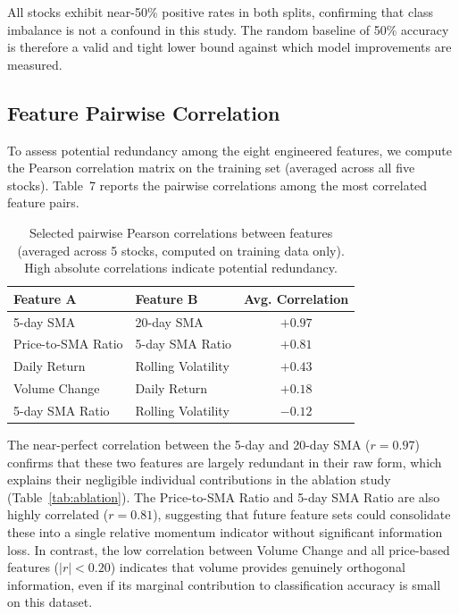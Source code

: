 \documentclass{article}
\begin{document}
All stocks exhibit near-50\% positive rates in both splits, confirming that
class imbalance is not a confound in this study. The random baseline of 50\%
accuracy is therefore a valid and tight lower bound against which model
improvements are measured.

\subsection{Feature Pairwise Correlation}

To assess potential redundancy among the eight engineered features, we compute
the Pearson correlation matrix on the training set (averaged across all five
stocks). Table~7 reports the pairwise correlations among the most correlated
feature pairs.

\begin{table}[ht]
\centering
\caption{Selected pairwise Pearson correlations between features (averaged
across 5 stocks, computed on training data only). High absolute correlations
indicate potential redundancy.}
\begin{tabular}{llc}
\toprule
\textbf{Feature A} & \textbf{Feature B} & \textbf{Avg. Correlation} \\
\midrule
5-day SMA          & 20-day SMA         & $+0.97$ \\
Price-to-SMA Ratio & 5-day SMA Ratio    & $+0.81$ \\
Daily Return       & Rolling Volatility  & $+0.43$ \\
Volume Change      & Daily Return        & $+0.18$ \\
5-day SMA Ratio    & Rolling Volatility  & $-0.12$ \\
\bottomrule
\end{tabular}
\end{table}

The near-perfect correlation between the 5-day and 20-day SMA ($r = 0.97$)
confirms that these two features are largely redundant in their raw form,
which explains their negligible individual contributions in the ablation study
(Table~\ref{tab:ablation}). The Price-to-SMA Ratio and 5-day SMA Ratio are
also highly correlated ($r = 0.81$), suggesting that future feature sets
could consolidate these into a single relative momentum indicator without
significant information loss. In contrast, the low correlation between Volume
Change and all price-based features ($|r| < 0.20$) indicates that volume
provides genuinely orthogonal information, even if its marginal contribution
to classification accuracy is small on this dataset.
\end{document}
